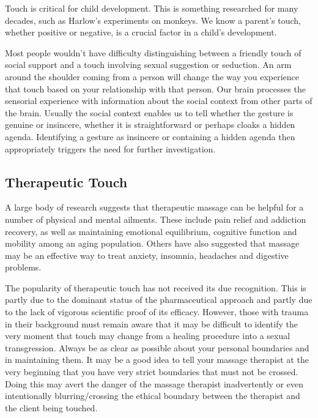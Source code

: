 \documentclass[]{book}
\begin{document}
Touch is critical for child development. This is something researched for many decades, such as Harlow's experiments on monkeys. We know a parent's touch, whether positive or negative, is a crucial factor in a child's development.

Most people wouldn't have difficulty distinguishing between a friendly touch of social support and a touch involving sexual suggestion or seduction. An arm around the shoulder coming from a person will change the way you experience that touch based on your relationship with that person. Our brain processes the sensorial experience with information about the social context from other parts of the brain. Usually the social context enables us to tell whether the gesture is genuine or insincere, whether it is straightforward or perhaps cloaks a hidden agenda. Identifying a gesture as insincere or containing a hidden agenda then appropriately triggers the need for further investigation.

\hypertarget{therapeutic-touch}{%
\subsection*{Therapeutic Touch}\label{therapeutic-touch}}

A large body of research suggests that therapeutic massage can be helpful for a number of physical and mental ailments. These include pain relief and addiction recovery, as well as maintaining emotional equilibrium, cognitive function and mobility among an aging population. Others have also suggested that massage may be an effective way to treat anxiety, insomnia, headaches and digestive problems.

The popularity of therapeutic touch has not received its due recognition. This is partly due to the dominant status of the pharmaceutical approach and partly due to the lack of vigorous scientific proof of its efficacy. However, those with trauma in their background must remain aware that it may be difficult to identify the very moment that touch may change from a healing procedure into a sexual transgression. Always be as clear as possible about your personal boundaries and in maintaining them. It may be a good idea to tell your massage therapist at the very beginning that you have very strict boundaries that must not be crossed. Doing this may avert the danger of the massage therapist inadvertently or even intentionally blurring/crossing the ethical boundary between the therapist and the client being touched.
\end{document}
